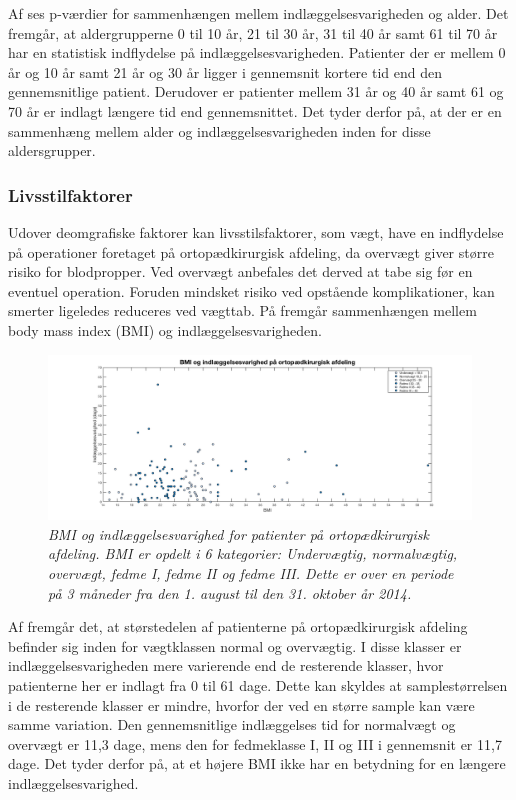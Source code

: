\noindent
Af  ses p-værdier for sammenhængen mellem indlæggelsesvarigheden og alder. Det fremgår, at aldergrupperne 0 til 10 år, 21 til 30 år, 31 til 40 år samt 61 til 70 år har en statistisk indflydelse på indlæggelsesvarigheden. Patienter der er mellem 0 år og 10 år samt 21 år og 30 år ligger i gennemsnit kortere tid end den gennemsnitlige patient. Derudover er patienter mellem 31 år og 40 år samt 61 og 70 år er indlagt længere tid end gennemsnittet. Det tyder derfor på, at der er en sammenhæng mellem alder og indlæggelsesvarigheden inden for disse aldersgrupper.


\subsubsection{Livsstilfaktorer}
Udover deomgrafiske faktorer kan livsstilsfaktorer, som vægt, have en indflydelse på operationer foretaget på ortopædkirurgisk afdeling, da overvægt giver større risiko for blodpropper\cite{Ermonds2004}. Ved overvægt anbefales det derved at tabe sig før en eventuel operation. Foruden mindsket risiko ved opstående komplikationer, kan smerter ligeledes reduceres ved vægttab.\cite{Nordjylland2014} På  fremgår sammenhængen mellem body mass index (BMI) og indlæggelsesvarigheden.

\begin{figure}[H]
	\centering
	\includegraphics[scale=0.35]{figures/BMIogindlaeg}
	\caption{\textit{BMI og indlæggelsesvarighed for patienter på ortopædkirurgisk afdeling. BMI er opdelt i 6 kategorier: Undervægtig, normalvægtig, overvægt, fedme I, fedme II og fedme III. Dette er over en periode på 3 måneder fra den 1. august til den 31. oktober år 2014.}}
	\label{BMIogindlaeggelse}
\end{figure}

\noindent
Af  fremgår det, at størstedelen af patienterne på ortopædkirurgisk afdeling befinder sig inden for vægtklassen normal og overvægtig. I disse klasser er indlæggelsesvarigheden mere varierende end de resterende klasser, hvor patienterne her er indlagt fra 0 til 61 dage. Dette kan skyldes at samplestørrelsen i de resterende klasser er mindre, hvorfor der ved en større sample kan være samme variation. 
Den gennemsnitlige indlæggelses tid for normalvægt og overvægt er 11,3 dage, mens den for fedmeklasse I, II og III i gennemsnit er 11,7 dage. Det tyder derfor på, at et højere BMI ikke har en betydning for en længere indlæggelsesvarighed. 


